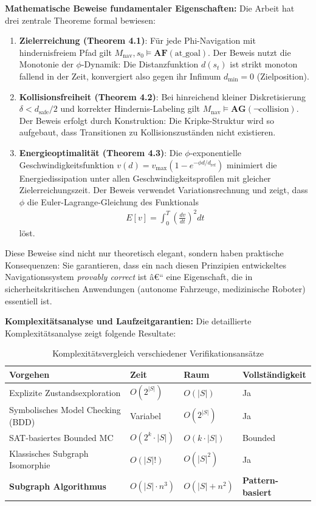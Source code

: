 ﻿\documentclass[a4paper,12pt]{article}
\theoremstyle{definition}
\begin{document}
\textbf{Mathematische Beweise fundamentaler Eigenschaften:}
Die Arbeit hat drei zentrale Theoreme formal bewiesen:

\begin{enumerate}
	\item \textbf{Zielerreichung (Theorem 4.1)}: Für jede Phi-Navigation mit hindernisfreiem Pfad gilt $M_{\text{nav}}, s_0 \models \mathbf{AF}(\text{at\_goal})$. Der Beweis nutzt die Monotonie der $\phi$-Dynamik: Die Distanzfunktion $d(s_t)$ ist strikt monoton fallend in der Zeit, konvergiert also gegen ihr Infimum $d_{\text{min}} = 0$ (Zielposition).
	
	\item \textbf{Kollisionsfreiheit (Theorem 4.2)}: Bei hinreichend kleiner Diskretisierung $\delta < d_{\text{safe}}/2$ und korrekter Hindernis-Labeling gilt $M_{\text{nav}} \models \mathbf{AG}(\neg\text{collision})$. Der Beweis erfolgt durch Konstruktion: Die Kripke-Struktur wird so aufgebaut, dass Transitionen zu Kollisionszuständen nicht existieren.
	
	\item \textbf{Energieoptimalität (Theorem 4.3)}: Die $\phi$-exponentielle Geschwindigkeitsfunktion $v(d) = v_{\max}(1 - e^{-\phi d/d_{\text{ref}}})$ minimiert die Energiedissipation unter allen Geschwindigkeitsprofilen mit gleicher Zielerreichungszeit. Der Beweis verwendet Variationsrechnung und zeigt, dass $\phi$ die Euler-Lagrange-Gleichung des Funktionals
	\begin{align}
		E[v] = \int_0^T \left(\frac{dv}{dt}\right)^2 dt
	\end{align}
	löst.
\end{enumerate}

Diese Beweise sind nicht nur theoretisch elegant, sondern haben praktische Konsequenzen: Sie garantieren, dass ein nach diesen Prinzipien entwickeltes Navigationssystem \textit{provably correct} ist â€“ eine Eigenschaft, die in sicherheitskritischen Anwendungen (autonome Fahrzeuge, medizinische Roboter) essentiell ist.

\textbf{Komplexitätsanalyse und Laufzeitgarantien:}
Die detaillierte Komplexitätsana\-lyse zeigt folgende Resultate:

\begin{table}[h]
	\centering
	\caption{Komplexitätsvergleich verschiedener Verifikationsansätze}
	\label{tab:complexity_final}
	\begin{tabular}{llll}
		\toprule
		Vorgehen & Zeit & Raum & Vollständigkeit \\
		\midrule
		Explizite Zustandsexploration & $O(2^{|S|})$ & $O(|S|)$ & Ja \\
		Symbolisches Model Checking (BDD) & Variabel & $O(2^{|S|})$ & Ja \\
		SAT-basiertes Bounded MC & $O(2^k \cdot |S|)$ & $O(k \cdot |S|)$ & Bounded \\
		Klassisches Subgraph Isomorphie & $O(|S|!)$ & $O(|S|^2)$ & Ja \\
		\textbf{Subgraph Algorithmus} & \textbf{$O(|S| \cdot n^3)$} & \textbf{$O(|S| + n^2)$} & \textbf{Pattern-basiert} \\
		\bottomrule
	\end{tabular}
\end{table}
\end{document}
